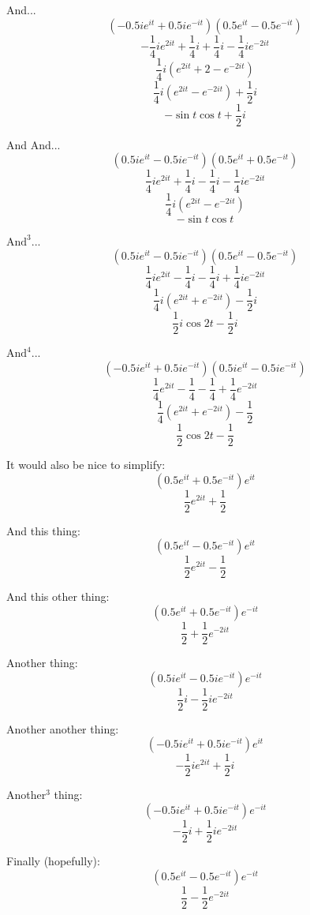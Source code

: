 \documentclass{article}
\begin{document}
And... 
\[ ({-0.5ie^{it} + 0.5ie^{-it}})({0.5e^{it} - 0.5e^{-it}}) \]
\[ -\frac{1}{4}ie^{2it} + \frac{1}{4}i + \frac{1}{4}i - \frac{1}{4}ie^{-2it} \]
\[ \frac{1}{4}i\left( e^{2it} + 2 - e^{-2it} \right) \]
\[ \frac{1}{4}i\left( e^{2it} - e^{-2it} \right) + \frac{1}{2}i \]
\[ -\sin{t}\cos{t} + \frac{1}{2}i \]

And And... 
\[ ({0.5ie^{it} - 0.5ie^{-it}})({0.5e^{it} + 0.5e^{-it}}) \]
\[ \frac{1}{4}ie^{2it} + \frac{1}{4}i - \frac{1}{4}i - \frac{1}{4}ie^{-2it} \]
\[ \frac{1}{4}i\left( e^{2it} - e^{-2it} \right) \]
\[ -\sin{t}\cos{t} \]

$\text{And}^3$... 
\[ ({0.5ie^{it} - 0.5ie^{-it}})({0.5e^{it} - 0.5e^{-it}}) \]
\[ \frac{1}{4}ie^{2it} - \frac{1}{4}i - \frac{1}{4}i + \frac{1}{4}ie^{-2it} \]
\[ \frac{1}{4}i\left(e^{2it} + e^{-2it} \right) - \frac{1}{2}i \]
\[ \frac{1}{2}i\cos{2t} - \frac{1}{2}i \]

$\text{And}^4$... 
\[ ({-0.5ie^{it} + 0.5ie^{-it}})({0.5ie^{it} - 0.5ie^{-it}}) \]
\[ \frac{1}{4}e^{2it} - \frac{1}{4} - \frac{1}{4} + \frac{1}{4}e^{-2it} \]
\[ \frac{1}{4}\left(e^{2it} + e^{-2it}\right) - \frac{1}{2} \]
\[ \frac{1}{2}\cos{2t} - \frac{1}{2}  \]

It would also be nice to simplify:
\[ ({0.5e^{it} + 0.5e^{-it}})e^{it} \]
\[ \frac{1}{2}e^{2it} + \frac{1}{2} \]

And this thing: 
\[ ({0.5e^{it} - 0.5e^{-it}})e^{it} \]
\[ \frac{1}{2}e^{2it} - \frac{1}{2} \]

And this other thing: 
\[ ({0.5e^{it} + 0.5e^{-it}})e^{-it} \]
\[ \frac{1}{2} + \frac{1}{2}e^{-2it} \]

Another thing: 
\[ ({0.5ie^{it} - 0.5ie^{-it}})e^{-it} \]
\[ \frac{1}{2}i - \frac{1}{2}ie^{-2it} \]

Another another thing: 
\[ ({-0.5ie^{it} + 0.5ie^{-it}})e^{it} \]
\[ -\frac{1}{2}ie^{2it} + \frac{1}{2}i \]

Another$^3$ thing: 
\[ ({-0.5ie^{it} + 0.5ie^{-it}})e^{-it} \]
\[ -\frac{1}{2}i + \frac{1}{2}ie^{-2it} \]

Finally (hopefully): 
\[ ({0.5e^{it} - 0.5e^{-it}})e^{-it} \]
\[ \frac{1}{2} - \frac{1}{2}e^{-2it} \]
\end{document}
